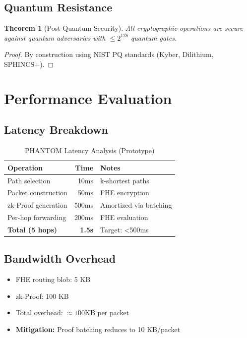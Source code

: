 \documentclass[11pt]{article}
\newtheorem{theorem}{Theorem}
\begin{document}
\subsection{Quantum Resistance}

\begin{theorem}[Post-Quantum Security]
All cryptographic operations are secure against quantum adversaries with $\leq 2^{128}$ quantum gates.
\end{theorem}

\begin{proof}
By construction using NIST PQ standards (Kyber, Dilithium, SPHINCS+).
\end{proof}

\section{Performance Evaluation}

\subsection{Latency Breakdown}

\begin{table}[h]
\centering
\begin{tabular}{|l|r|l|}
\hline
\textbf{Operation} & \textbf{Time} & \textbf{Notes} \\
\hline
Path selection & 10ms & k-shortest paths \\
Packet construction & 50ms & FHE encryption \\
zk-Proof generation & 500ms & Amortized via batching \\
Per-hop forwarding & 200ms & FHE evaluation \\
\textbf{Total (5 hops)} & \textbf{1.5s} & Target: <500ms \\
\hline
\end{tabular}
\caption{PHANTOM Latency Analysis (Prototype)}
\end{table}

\subsection{Bandwidth Overhead}

\begin{itemize}
\item FHE routing blob: 5 KB
\item zk-Proof: 100 KB
\item Total overhead: $\approx 100$KB per packet
\item \textbf{Mitigation:} Proof batching reduces to 10 KB/packet
\end{itemize}
\end{document}
